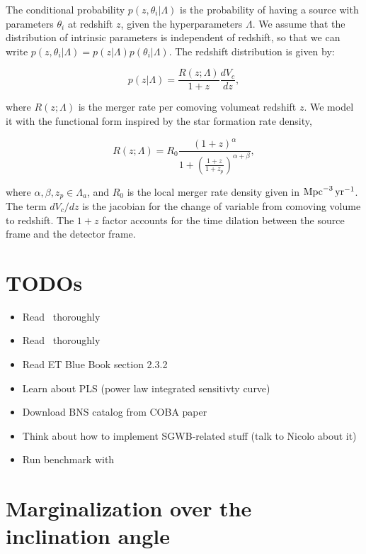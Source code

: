 \documentclass{article}
\begin{document}
The conditional probability $p(z, \theta_i | \Lambda)$ is the probability of
having a source with parameters $\theta_i$ at redshift $z$, given the
hyperparameters $\Lambda$. We assume that the distribution of intrinsic
parameters is independent of redshift, so that we can write $p(z, \theta_i |
	\Lambda) = p(z | \Lambda) p(\theta_i | \Lambda)$. The redshift distribution is
given by:

\begin{equation}
	p(z | \Lambda) = \frac{R(z; \Lambda)}{1+z} \frac{dV_c}{dz},
	\label{eq:redshift-distribution}
\end{equation}

where $R(z; \Lambda)$ is the merger rate per comoving volumeat redshift $z$. We
model it with the functional form inspired by the star formation rate density,

\begin{equation}
	R(z; \Lambda) = R_0 \frac{(1+z)^{\alpha}}{1 + \left(\frac{1+z}{1+z_p}\right)^{\alpha+\beta}},
	\label{eq:merger-rate}
\end{equation}

where $\alpha, \beta, z_p \in \Lambda_a$, and $R_0$ is the local merger rate
density given in $\rm{Mpc}^{-3} \, \rm{yr}^{-1}$. The term $dV_c/dz$ is the
jacobian for the change of variable from comoving volume to redshift. The $1+z$
factor accounts for the time dilation between the source frame and the detector
frame.

\section{TODOs}
\begin{itemize}
	\item Read~\cite{Capurri:2023jsy} thoroughly
	\item Read~\cite{Belgacem:2018lbp} thoroughly
	\item Read ET Blue Book section 2.3.2
	\item Learn about PLS (power law integrated sensitivty curve)
	\item Download BNS catalog from COBA paper
	\item Think about how to implement SGWB-related stuff (talk to Nicolo about it)
	\item Run benchmark with~\cite{Capurri:2023jsy}
\end{itemize}

\printbibliography

\appendix

\section{Marginalization over the inclination angle}
\end{document}
